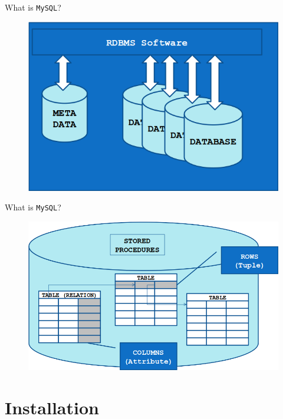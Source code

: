 \documentclass[xcolor=table]{beamer}
\begin{document}
\begin{frame}{What is \texttt{MySQL}?}
  \begin{figure}
    \begin{center}
      \includegraphics[width=0.8\linewidth]{What.png}
    \end{center}
  \end{figure}
\end{frame}

\begin{frame}{What is \texttt{MySQL}?}
  \begin{figure}
    \begin{center}
      \includegraphics[width=0.8\linewidth]{What2.png}
    \end{center}
  \end{figure}
\end{frame}

\section{Installation}
\end{document}
